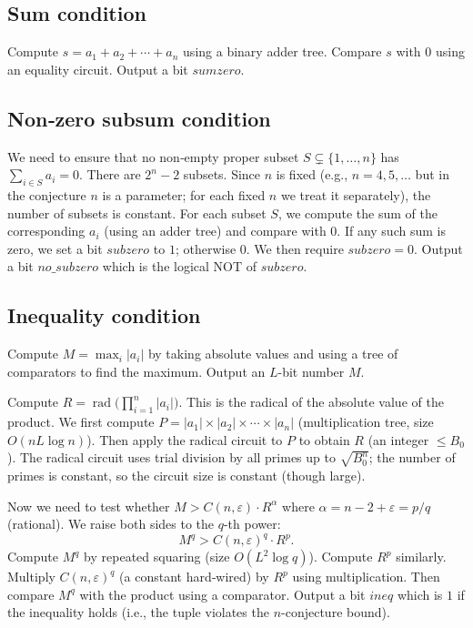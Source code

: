 \documentclass[11pt,a4paper]{article}
\begin{document}
\subsection{Sum condition}
Compute $s = a_1 + a_2 + \cdots + a_n$ using a binary adder tree. Compare $s$ with $0$ using an equality circuit. Output a bit $sumzero$.

\subsection{Non‑zero subsum condition}
We need to ensure that no non‑empty proper subset $S \subsetneq \{1,\dots,n\}$ has $\sum_{i\in S} a_i = 0$. There are $2^n - 2$ subsets. Since $n$ is fixed (e.g., $n=4,5,\dots$ but in the conjecture $n$ is a parameter; for each fixed $n$ we treat it separately), the number of subsets is constant. For each subset $S$, we compute the sum of the corresponding $a_i$ (using an adder tree) and compare with $0$. If any such sum is zero, we set a bit $subzero$ to $1$; otherwise $0$. We then require $subzero = 0$. Output a bit $no\_subzero$ which is the logical NOT of $subzero$.

\subsection{Inequality condition}
Compute $M = \max_i |a_i|$ by taking absolute values and using a tree of comparators to find the maximum. Output an $L$-bit number $M$.

Compute $R = \operatorname{rad}\bigl(\prod_{i=1}^n |a_i|\bigr)$. This is the radical of the absolute value of the product. We first compute $P = |a_1| \times |a_2| \times \cdots \times |a_n|$ (multiplication tree, size $O(nL \log n)$). Then apply the radical circuit to $P$ to obtain $R$ (an integer $\le B_0$). The radical circuit uses trial division by all primes up to $\sqrt{B_0^n}$; the number of primes is constant, so the circuit size is constant (though large).

Now we need to test whether $M > C(n,\varepsilon) \cdot R^{\alpha}$ where $\alpha = n-2+\varepsilon = p/q$ (rational). We raise both sides to the $q$-th power:
\[
M^q > C(n,\varepsilon)^q \cdot R^p.
\]
Compute $M^q$ by repeated squaring (size $O(L^2 \log q)$). Compute $R^p$ similarly. Multiply $C(n,\varepsilon)^q$ (a constant hard‑wired) by $R^p$ using multiplication. Then compare $M^q$ with the product using a comparator. Output a bit $ineq$ which is $1$ if the inequality holds (i.e., the tuple violates the $n$-conjecture bound).
\end{document}
